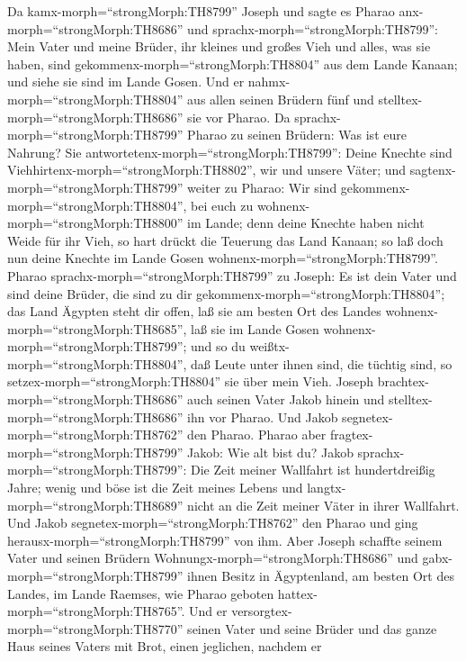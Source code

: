  Da kamx-morph=``strongMorph:TH8799'' Joseph und sagte es
Pharao anx-morph=``strongMorph:TH8686'' und
sprachx-morph=``strongMorph:TH8799'': Mein Vater und meine Brüder, ihr
kleines und großes Vieh und alles, was sie haben, sind
gekommenx-morph=``strongMorph:TH8804'' aus dem Lande Kanaan; und siehe
sie sind im Lande Gosen.  Und er
nahmx-morph=``strongMorph:TH8804'' aus allen seinen Brüdern fünf und
stelltex-morph=``strongMorph:TH8686'' sie vor Pharao.  Da
sprachx-morph=``strongMorph:TH8799'' Pharao zu seinen Brüdern: Was ist
eure Nahrung? Sie antwortetenx-morph=``strongMorph:TH8799'': Deine
Knechte sind Viehhirtenx-morph=``strongMorph:TH8802'', wir und unsere
Väter;  und sagtenx-morph=``strongMorph:TH8799'' weiter zu
Pharao: Wir sind gekommenx-morph=``strongMorph:TH8804'', bei euch zu
wohnenx-morph=``strongMorph:TH8800'' im Lande; denn deine Knechte haben
nicht Weide für ihr Vieh, so hart drückt die Teuerung das Land Kanaan;
so laß doch nun deine Knechte im Lande Gosen
wohnenx-morph=``strongMorph:TH8799''.  Pharao
sprachx-morph=``strongMorph:TH8799'' zu Joseph: Es ist dein Vater und
sind deine Brüder, die sind zu dir
gekommenx-morph=``strongMorph:TH8804'';  das Land Ägypten
steht dir offen, laß sie am besten Ort des Landes
wohnenx-morph=``strongMorph:TH8685'', laß sie im Lande Gosen
wohnenx-morph=``strongMorph:TH8799''; und so du
weißtx-morph=``strongMorph:TH8804'', daß Leute unter ihnen sind, die
tüchtig sind, so setzex-morph=``strongMorph:TH8804'' sie über mein Vieh.
 Joseph brachtex-morph=``strongMorph:TH8686'' auch seinen
Vater Jakob hinein und stelltex-morph=``strongMorph:TH8686'' ihn vor
Pharao. Und Jakob segnetex-morph=``strongMorph:TH8762'' den Pharao.
 Pharao aber fragtex-morph=``strongMorph:TH8799'' Jakob: Wie
alt bist du?  Jakob sprachx-morph=``strongMorph:TH8799'':
Die Zeit meiner Wallfahrt ist hundertdreißig Jahre; wenig und böse ist
die Zeit meines Lebens und langtx-morph=``strongMorph:TH8689'' nicht an
die Zeit meiner Väter in ihrer Wallfahrt.  Und Jakob
segnetex-morph=``strongMorph:TH8762'' den Pharao und ging
herausx-morph=``strongMorph:TH8799'' von ihm.  Aber Joseph
schaffte seinem Vater und seinen Brüdern
Wohnungx-morph=``strongMorph:TH8686'' und
gabx-morph=``strongMorph:TH8799'' ihnen Besitz in Ägyptenland, am besten
Ort des Landes, im Lande Raemses, wie Pharao geboten
hattex-morph=``strongMorph:TH8765''.  Und er
versorgtex-morph=``strongMorph:TH8770'' seinen Vater und seine Brüder
und das ganze Haus seines Vaters mit Brot, einen jeglichen, nachdem er
